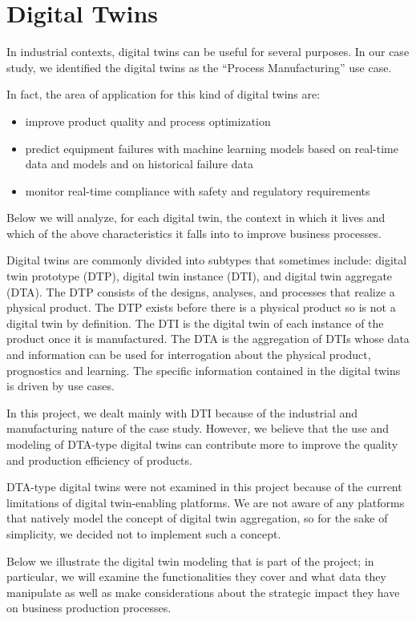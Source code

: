 \chapter{Digital Twins}
In industrial contexts, digital twins can be useful for several purposes.
In our case study, we identified the digital twins as the ``Process Manufacturing'' use case.

In fact, the area of application for this kind of digital twins are:
\begin{itemize}
	\item improve product quality and process optimization
	\item predict equipment failures with machine learning models based on real-time data and models and on historical failure data
	\item monitor real-time compliance with safety and regulatory requirements
\end{itemize}
Below we will analyze, for each digital twin, the context in which it lives and which of the above characteristics it falls into to improve business processes.

Digital twins are commonly divided into subtypes that sometimes include: digital twin prototype (DTP), digital twin instance (DTI), and digital twin aggregate (DTA).
The DTP consists of the designs, analyses, and processes that realize a physical product.
The DTP exists before there is a physical product so is not a digital twin by definition.
The DTI is the digital twin of each instance of the product once it is manufactured.
The DTA is the aggregation of DTIs whose data and information can be used for interrogation about the physical product, prognostics and learning.
The specific information contained in the digital twins is driven by use cases.

In this project, we dealt mainly with DTI because of the industrial and manufacturing nature of the case study.
However, we believe that the use and modeling of DTA-type digital twins can contribute more to improve the quality and production efficiency of products.

DTA-type digital twins were not examined in this project because of the current limitations of digital twin-enabling platforms.
We are not aware of any platforms that natively model the concept of digital twin aggregation, so for the sake of simplicity, we decided not to implement such a concept.


Below we illustrate the digital twin modeling that is part of the project; in particular, we will examine the functionalities they cover and what data they
manipulate as well as make considerations about the strategic impact they have on business production processes.

